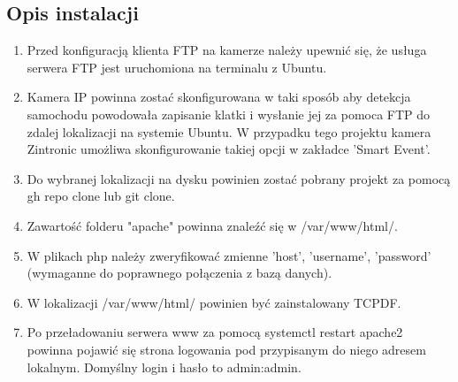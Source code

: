\documentclass[12pt,a4paper,oneside]{article}
\theoremstyle{definition}
\numberwithin{equation}{section}
\begin{document}
\subsection{Opis instalacji}
\begin{enumerate}
  \item Przed konfiguracją klienta FTP na kamerze należy upewnić się, że usługa serwera FTP jest uruchomiona na terminalu z Ubuntu. 
  \item Kamera IP powinna zostać skonfigurowana w taki sposób aby detekcja samochodu powodowała zapisanie klatki i wysłanie jej za pomoca FTP do zdalej lokalizacji na systemie Ubuntu. W przypadku tego projektu kamera Zintronic umożliwa skonfigurowanie takiej opcji w zakładce 'Smart Event'.
  \item Do wybranej lokalizacji na dysku powinien zostać pobrany projekt za pomocą gh repo clone lub git clone.
  \item Zawartość folderu "apache" powinna znaleźć się w /var/www/html/.
  \item W plikach php należy zweryfikować zmienne 'host', 'username', 'password' (wymaganne do poprawnego połączenia z bazą danych). 
  \item W lokalizacji /var/www/html/ powinien być zainstalowany TCPDF.
  \item Po przeładowaniu serwera www za pomocą systemctl restart apache2 powinna pojawić się strona logowania pod przypisanym do niego adresem lokalnym. Domyślny login i hasło to admin:admin. 
\end{enumerate}




%
%
%
\end{document}

